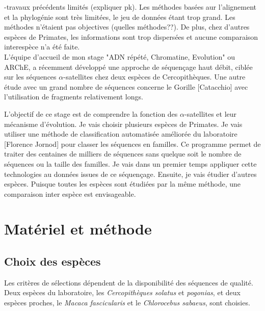 \documentclass[12pt,a4paper]{article}
\begin{document}
-travaux précédents limités (expliquer pk). Les méthodes basées aur l'alignement et la phylogénie sont très limitées, le jeu de données étant trop grand. Les méthodes n'étaient pas objectives (quelles méthodes??). De plus, chez d'autres espèces de Primates, les informations sont trop dispersées et aucune comparaison interespèce n'a été faite. \\


L'équipe d'accueil de mon stage "ADN répété, Chromatine, Evolution" ou ARChE, a récemment développé une approche de séquençage haut débit, ciblée sur les séquences $\alpha$-satellites chez deux espèces de Cercopithèques. Une autre étude avec un grand nombre de séquences concerne le Gorille [Catacchio] avec l'utilisation de fragments relativement longs. 

L'objectif de ce stage est de comprendre la fonction des $\alpha$-satellites et leur mécanisme d'évolution. Je vais choisir plusieurs espèces de Primates. Je vais utiliser une méthode de classification automatisée améliorée du laboratoire [Florence Jornod] pour classer les séquences en familles.  Ce programme permet de traiter des centaines de milliers de séquences sans quelque soit le nombre de séquences ou la taille des familles. Je vais dans un premier temps appliquer cette technologies au données issues de ce séquençage. Ensuite, je vais étudier d'autres espèces. Puisque toutes les espèces sont étudiées par la  même méthode, une comparaison inter espèce est envisageable. 

\section{Matériel et méthode}
\subsection{Choix des espèces}
Les critères de sélections dépendent de la disponibilité des séquences de qualité. Deux espèces du laboratoire, les \textit{Cercopithèques solatus} et \textit{pogonias}, et deux espèces proches, le \textit{Macaca fascicularis} et le \textit{Chlorocebus sabaeus}, sont choisies.  

 
\end{document}
